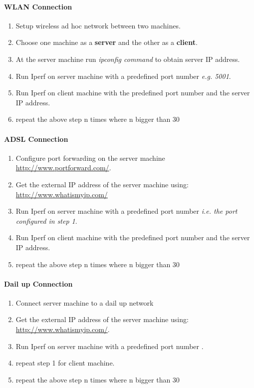 \documentclass[aps,letterpaper,10pt]{revtex4}
\begin{document}
        \paragraph{WLAN Connection}    
            \begin{enumerate}
        		\item Setup wireless ad hoc network between two machines.
        		\item Choose one machine as a \textbf{server} and the other as a \textbf{client}.
        		\item At the server machine run \textit{ipconfig command} to obtain server IP address.
        		\item Run Iperf on server machine with a predefined port number \textit{e.g. 5001}. 
        		\item Run Iperf on client machine with the predefined port number and the server IP address.
        		\item repeat the above step n times where n bigger than 30
        	\end{enumerate}
\vspace{3mm}  
        \paragraph{ADSL Connection}   
            \begin{enumerate}
            	\item Configure port forwarding on the server machine \url{http://www.portforward.com/}.
                \item Get the external IP address of the server machine using: \url{http://www.whatismyip.com/}
        		\item Run Iperf on server machine with a predefined port number \textit{i.e. the port configured in step 1}. 
        		\item Run Iperf on client machine with the predefined port number and the server IP address.
        		\item repeat the above step n times where n bigger than 30
        	\end{enumerate}
\vspace{3mm}  
        \paragraph{Dail up Connection}   
            \begin{enumerate}
                \item Connect server machine to a dail up network 
                \item Get the external IP address of the server machine using: \url{http://www.whatismyip.com/}.
        		\item Run Iperf on server machine with a predefined port number . 
        		\item repeat step 1 for client machine.
        		\item repeat the above step n times where n bigger than 30
        	\end{enumerate}
\end{document}
